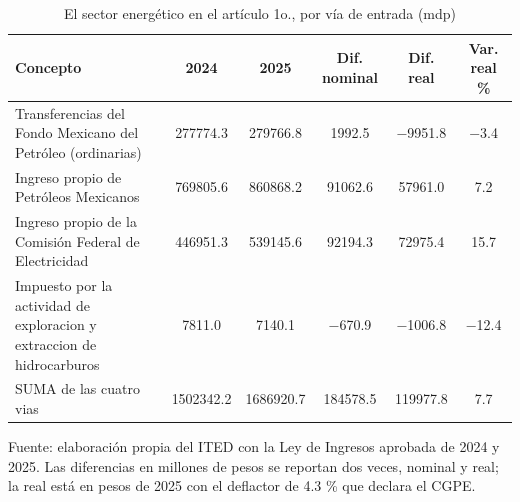 \begin{table}[htbp]
\centering
\caption{El sector energético en el artículo 1o., por vía de entrada (mdp)}
\label{tab:C3_1}
\footnotesize
\setlength{\tabcolsep}{4pt}
\begin{tabular}{L{4.2cm}SSSSS}
\toprule
{Concepto} & {2024} & {2025} & {Dif. nominal} & {Dif. real} & {Var. real \%} \\
\midrule
{Transferencias del Fondo Mexicano del Petróleo (ordinarias)} & \num{277774.3} & \num{279766.8} & \num{1992.5} & \num{-9951.8} & \num{-3.4} \\
{Ingreso propio de Petróleos Mexicanos} & \num{769805.6} & \num{860868.2} & \num{91062.6} & \num{57961.0} & \num{7.2} \\
{Ingreso propio de la Comisión Federal de Electricidad} & \num{446951.3} & \num{539145.6} & \num{92194.3} & \num{72975.4} & \num{15.7} \\
{Impuesto por la actividad de exploracion y extraccion de hidrocarburos} & \num{7811.0} & \num{7140.1} & \num{-670.9} & \num{-1006.8} & \num{-12.4} \\
{SUMA de las cuatro vias} & \num{1502342.2} & \num{1686920.7} & \num{184578.5} & \num{119977.8} & \num{7.7} \\
\bottomrule
\end{tabular}
\par\vspace{2pt}\footnotesize Fuente: elaboración propia del ITED con la Ley de Ingresos aprobada de 2024 y 2025. Las diferencias en millones de pesos se reportan dos veces, nominal y real; la real está en pesos de 2025 con el deflactor de 4.3 \% que declara el CGPE.
\end{table}
